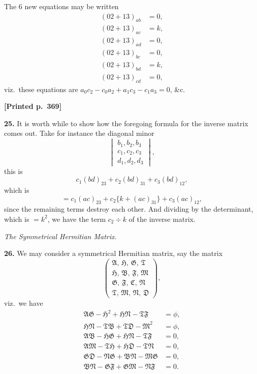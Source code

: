 \documentclass[11pt]{article}
\begin{document}
The 6 new equations may be written
\begin{align*}
(02+13)_{ab} &= 0,\\
(02+13)_{ac} &= k,\\
(02+13)_{ad} &= 0,\\
(02+13)_{bc} &= 0,\\
(02+13)_{bd} &= k,\\
(02+13)_{cd} &= 0,
\end{align*}
viz.\ these equations are $a_{0}c_{2}-c_{0}a_{2}+a_{1}c_{3}-c_{1}a_{3}=0$, \&c.

\medskip
\noindent\textbf{[Printed p.~369]}\hfill

\medskip
\noindent\textbf{25.} It is worth while to show how the foregoing formula for the inverse matrix comes out. Take for instance the diagonal minor
\[
\begin{vmatrix}b_{1},b_{2},b_{3}\\ c_{1},c_{2},c_{3}\\ d_{1},d_{2},d_{3}\end{vmatrix},
\]
this is
\[
c_{1}(bd)_{23}+c_{2}(bd)_{31}+c_{3}(bd)_{12},
\]
which is
\[
=c_{1}(ac)_{23}+c_{2}\{k+(ac)_{31}\}+c_{3}(ac)_{12},
\]
since the remaining terms destroy each other. And dividing by the determinant, which is $=k^{2}$, we have the term $c_{2}\div k$ of the inverse matrix.

\medskip
\begin{center}\textit{The Symmetrical Hermitian Matrix.}\end{center}

\noindent\textbf{26.} We may consider a symmetrical Hermitian matrix, say the matrix
\[
\begin{pmatrix}\mathfrak{A},\,\mathfrak{H},\,\mathfrak{G},\,\mathfrak{T}\\ \mathfrak{H},\,\mathfrak{B},\,\mathfrak{F},\,\mathfrak{M}\\ \mathfrak{G},\,\mathfrak{F},\,\mathfrak{C},\,\mathfrak{N}\\ \mathfrak{T},\,\mathfrak{M},\,\mathfrak{N},\,\mathfrak{D}\end{pmatrix},
\]
viz.\ we have
\begin{align*}
\mathfrak{A}\mathfrak{G}-\mathfrak{H}^{2}+\mathfrak{H}\mathfrak{N}-\mathfrak{T}\mathfrak{F} &= \phi,\\
\mathfrak{H}\mathfrak{N}-\mathfrak{T}\mathfrak{B}+\mathfrak{T}\mathfrak{D}-\mathfrak{M}^{2} &= \phi,\\
\mathfrak{A}\mathfrak{B}-\mathfrak{H}\mathfrak{G}+\mathfrak{H}\mathfrak{N}-\mathfrak{T}\mathfrak{F} &= 0,\\
\mathfrak{A}\mathfrak{M}-\mathfrak{T}\mathfrak{H}+\mathfrak{H}\mathfrak{D}-\mathfrak{T}\mathfrak{N} &= 0,\\
\mathfrak{G}\mathfrak{D}-\mathfrak{N}\mathfrak{G}+\mathfrak{B}\mathfrak{N}-\mathfrak{M}\mathfrak{G} &= 0,\\
\mathfrak{B}\mathfrak{N}-\mathfrak{G}\mathfrak{F}+\mathfrak{G}\mathfrak{M}-\mathfrak{N}\mathfrak{F} &= 0.
\end{align*}
\end{document}
